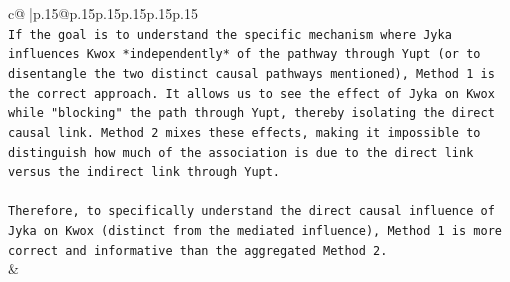 \documentclass{article}
\begin{document}
{\begin{supertabular}{c@{$\;$}|p{.15\linewidth}@{}p{.15\linewidth}p{.15\linewidth}p{.15\linewidth}p{.15\linewidth}p{.15\linewidth}}
{{{\\ 
\texttt{If the goal is to understand the specific mechanism where Jyka influences Kwox *independently* of the pathway through Yupt (or to disentangle the two distinct causal pathways mentioned), Method 1 is the correct approach. It allows us to see the effect of Jyka on Kwox while "blocking" the path through Yupt, thereby isolating the direct causal link. Method 2 mixes these effects, making it impossible to distinguish how much of the association is due to the direct link versus the indirect link through Yupt.} \\
\\ 
\texttt{Therefore, to specifically understand the direct causal influence of Jyka on Kwox (distinct from the mediated influence), Method 1 is more correct and informative than the aggregated Method 2.} \\
            }
        }
    }
    & \\ \\


\end{supertabular}}
\end{document}
